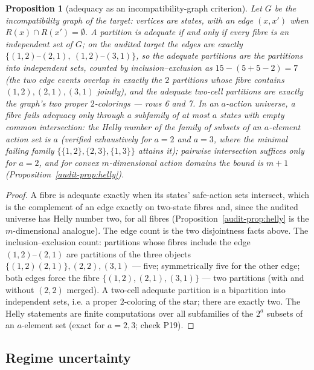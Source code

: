 \documentclass[10pt,twocolumn]{article}
\theoremstyle{plain}
\newtheorem{proposition}[theorem]{Proposition}
\theoremstyle{definition}
\theoremstyle{remark}
\begin{document}
\begin{proposition}[adequacy as an incompatibility-graph criterion]
\label{audit-prop:adequacy}
Let \(G\) be the incompatibility graph of the target: vertices are
states, with an edge \((x, x')\) when \(R(x) \cap R(x') =
\emptyset\). A partition is adequate if and only if every fibre is an
independent set of \(G\); on the audited target the edges are exactly
\(\{(1,2)\text{--}(2,1),\ (1,2)\text{--}(3,1)\}\), so the adequate
partitions are the partitions into independent sets, counted by
inclusion--exclusion as \(15 - (5 + 5 - 2) = 7\) (the two edge events
overlap in exactly the \(2\) partitions whose fibre contains
\((1,2), (2,1), (3,1)\) jointly), and the adequate two-cell partitions
are exactly the graph's two proper \(2\)-colorings --- rows 6 and 7.
In an \(a\)-action universe, a fibre fails adequacy only through a
subfamily of at most \(a\) states with empty common intersection: the
Helly number of the family of subsets of an \(a\)-element action set
is \(a\) (verified exhaustively for \(a = 2\) and \(a = 3\), where the
minimal failing family \(\{\{1,2\}, \{2,3\}, \{1,3\}\}\) attains it);
pairwise intersection suffices only for \(a = 2\), and for convex
\(m\)-dimensional action domains the bound is \(m + 1\)
(Proposition~\ref{audit-prop:helly}).
\end{proposition}

\begin{proof}
A fibre is adequate exactly when its states' safe-action sets intersect,
which is the complement of an edge exactly on two-state fibres and,
since the audited universe has Helly number two, for all fibres
(Proposition~\ref{audit-prop:helly} is the \(m\)-dimensional analogue). The
edge count is the two disjointness facts above. The inclusion--exclusion
count: partitions whose fibres include the edge \((1,2)\text{--}(2,1)\)
are partitions of the three objects \(\{(1,2)(2,1)\}, (2,2), (3,1)\) ---
five; symmetrically five for the other edge; both edges force the
fibre \(\{(1,2), (2,1), (3,1)\}\) --- two partitions (with and without
\((2,2)\) merged). A two-cell adequate partition is a bipartition into
independent sets, i.e. a proper \(2\)-coloring of the star; there are
exactly two. The Helly statements are finite computations over all
subfamilies of the \(2^{a}\) subsets of an \(a\)-element set (exact for
\(a = 2, 3\); check P19).
\end{proof}

\subsection{Regime uncertainty}\label{audit-regimes}
\end{document}
